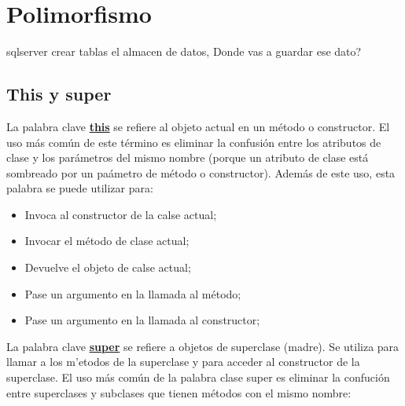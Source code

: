 \chapter{Polimorfismo}


sqlserver crear tablas el almacen de datos, Donde vas a guardar ese dato? 


\section{This y super}

La palabra clave \href{https://docs.oracle.com/javase/tutorial/java/javaOO/thiskey.html}{\bf this} se refiere al objeto actual en un m\'etodo o constructor. El uso m\'as com\'un de este t\'ermino es eliminar la confusi\'on 
entre los atributos de clase y los par\'ametros del mismo nombre (porque un atributo de clase est\'a sombreado por un pa\'ametro de m\'etodo o constructor).
Adem\'as de este uso, esta palabra se puede utilizar para:

\begin{itemize}
    \item Invoca al constructor de la calse actual;
    \item Invocar el m\'etodo de clase actual;
    \item Devuelve el objeto de calse actual;
    \item Pase un argumento en la llamada al m\'etodo;
    \item Pase un argumento en la llamada al constructor;
\end{itemize}

La palabra clave \href{https://docs.oracle.com/javase/tutorial/java/IandI/super.html}{\bf super} se refiere a objetos de superclase (madre). Se utiliza para llamar a los m'etodos de la superclase y para acceder al constructor de la superclase.
El uso m\'as com\'un de la palabra clase super es eliminar la confuci\'on entre superclases y subclases que tienen m\'etodos con el mismo nombre: 


